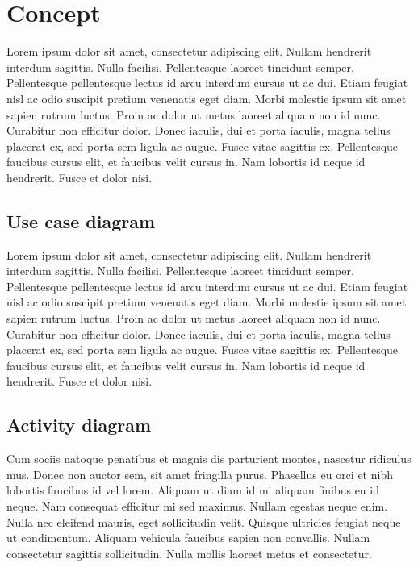 \section{Concept}

Lorem ipsum dolor sit amet, consectetur adipiscing elit. Nullam hendrerit interdum sagittis. Nulla facilisi. Pellentesque laoreet tincidunt semper. Pellentesque pellentesque lectus id arcu interdum cursus ut ac dui. Etiam feugiat nisl ac odio suscipit pretium venenatis eget diam. Morbi molestie ipsum sit amet sapien rutrum luctus. Proin ac dolor ut metus laoreet aliquam non id nunc. Curabitur non efficitur dolor. Donec iaculis, dui et porta iaculis, magna tellus placerat ex, sed porta sem ligula ac augue. Fusce vitae sagittis ex. Pellentesque faucibus cursus elit, et faucibus velit cursus in. Nam lobortis id neque id hendrerit. Fusce et dolor nisi.


\subsection{Use case diagram}
Lorem ipsum dolor sit amet, consectetur adipiscing elit. Nullam hendrerit interdum sagittis. Nulla facilisi. Pellentesque laoreet tincidunt semper. Pellentesque pellentesque lectus id arcu interdum cursus ut ac dui. Etiam feugiat nisl ac odio suscipit pretium venenatis eget diam. Morbi molestie ipsum sit amet sapien rutrum luctus. Proin ac dolor ut metus laoreet aliquam non id nunc. Curabitur non efficitur dolor. Donec iaculis, dui et porta iaculis, magna tellus placerat ex, sed porta sem ligula ac augue. Fusce vitae sagittis ex. Pellentesque faucibus cursus elit, et faucibus velit cursus in. Nam lobortis id neque id hendrerit. Fusce et dolor nisi.

\subsection{Activity diagram}

Cum sociis natoque penatibus et magnis dis parturient montes, nascetur ridiculus mus. Donec non auctor sem, sit amet fringilla purus. Phasellus eu orci et nibh lobortis faucibus id vel lorem. Aliquam ut diam id mi aliquam finibus eu id neque. Nam consequat efficitur mi sed maximus. Nullam egestas neque enim. Nulla nec eleifend mauris, eget sollicitudin velit. Quisque ultricies feugiat neque ut condimentum. Aliquam vehicula faucibus sapien non convallis. Nullam consectetur sagittis sollicitudin. Nulla mollis laoreet metus et consectetur.

